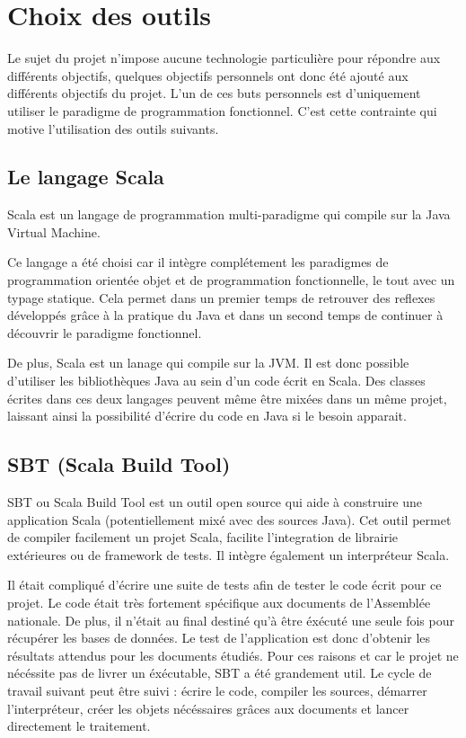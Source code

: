 \section{Choix des outils}

Le sujet du projet n'impose aucune technologie particulière pour répondre aux différents objectifs, quelques objectifs personnels ont donc été ajouté aux différents objectifs du projet. L'un de ces buts personnels est d'uniquement utiliser le paradigme de programmation fonctionnel. C'est cette contrainte qui motive l'utilisation des outils suivants.

\subsection{Le langage Scala}

Scala est un langage de programmation multi-paradigme qui compile sur la Java Virtual Machine.

Ce langage a été choisi car il intègre complétement les paradigmes de programmation orientée objet et de programmation fonctionnelle, le tout avec un typage statique. Cela permet dans un premier temps de retrouver des reflexes développés grâce à la pratique du Java et dans un second temps de continuer à découvrir le paradigme fonctionnel.

De plus, Scala est un lanage qui compile sur la JVM. Il est donc possible d'utiliser les bibliothèques Java au sein d'un code écrit en Scala. Des classes écrites dans ces deux langages peuvent même être mixées dans un même projet, laissant ainsi la possibilité d'écrire du code en Java si le besoin apparait.

\subsection{SBT (Scala Build Tool)}

SBT ou Scala Build Tool est un outil open source qui aide à construire une application Scala (potentiellement mixé avec des sources Java). Cet outil permet de compiler facilement un projet Scala, facilite l'integration de librairie extérieures ou de framework de tests. Il intègre également un interpréteur Scala.

Il était compliqué d'écrire une suite de tests afin de tester le code écrit pour ce projet. Le code était très fortement spécifique aux documents de l'Assemblée nationale. De plus, il n'était au final destiné qu'à être éxécuté une seule fois pour récupérer les bases de données. Le test de l'application est donc d'obtenir les résultats attendus pour les documents étudiés.\newline
Pour ces raisons et car le projet ne nécéssite pas de livrer un éxécutable, SBT a été grandement util. Le cycle de travail suivant peut être suivi : écrire le code, compiler les sources, démarrer l'interpréteur, créer les objets nécéssaires grâces aux documents et lancer directement le traitement.
